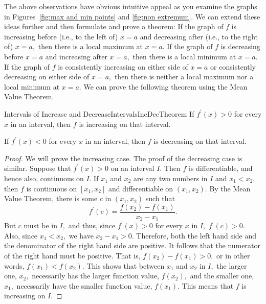 The above observations have obvious intuitive appeal as
you examine the graphs in Figures~\ref{fig:max and min points} and \ref{fig:non extremum}. We can extend these ideas
further and then formulate and prove a theorem: If the graph of $f$ is
increasing before (i.e., to the left of) $x=a$ and decreasing after (i.e.,
to the right of) $x=a,$ then there is a local maximum at $x=a.$ If the graph
of $f$ is decreasing before $x=a$ and increasing after $x=a,$ then there is
a local minimum at $x=a.$ If the graph of $f$ is consistently increasing on
either side of $x=a$ or consistently decreasing on either side of $x=a,$
then there is neither a local maximum nor a local minimum at $x=a.$ We can
prove the following theorem using the Mean Value Theorem.

\begin{theorem}{Intervals of Increase and Decrease}{IntervalsIncDecTheorem}
If $f^{\prime }\left( x\right) >0$ for every $x$ in an interval, then $f$ is
increasing on that interval.

If $f^{\prime }\left( x\right) <0$ for every $x$ in an interval, then $f$ is
decreasing on that interval.
\end{theorem}
\begin{proof}
We will prove the increasing case. The proof of the decreasing case
is similar. Suppose that $f^{\prime }\left( x\right) >0$ on an interval $I.$
Then $f$ is differentiable, and hence also, continuous on $I.$ If $x_{1}$
and $x_{2}$ are any two numbers in $I$ and $x_{1}<x_{2},$ then $f$ is
continuous on $\left[ x_{1},x_{2}\right] $ and differentiable on $\left(
x_{1},x_{2}\right) .$ By the Mean Value Theorem, there is some $c$ in $%
\left( x_{1},x_{2}\right) $ such that 
\begin{equation*}
f^{\prime }\left( c\right) =\frac{f\left( x_{2}\right) -f\left( x_{1}\right) 
}{x_{2}-x_{1}}.
\end{equation*}%
But $c$ must be in $I,$ and thus, since $f^{\prime }\left( x\right) >0$ for
every $x$ in $I,$ $f^{\prime }\left( c\right) >0$. Also, since $x_{1}<x_{2},$
we have $x_{2}-x_{1}>0.$ Therefore, both the left hand side and the
denominator of the right hand side are positive. It follows that the
numerator of the right hand must be positive. That is, $f\left( x_{2}\right)
-f\left( x_{1}\right) >0,$ or in other words, $f\left( x_{1}\right) <f\left(
x_{2}\right) .$ This shows that between $x_{1}$ and $x_{2}$ in $I,$ the
larger one, $x_{2},$ necessarily has the larger function value, $f\left(
x_{2}\right) ,$ and the smaller one, $x_{1},$ necessarily have the smaller
function value, $f\left( x_{1}\right) .$ This means that $f$ is increasing
on $I$.
\end{proof}

